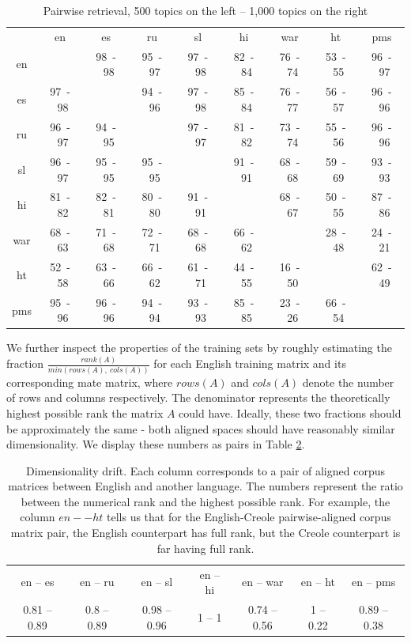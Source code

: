 \documentclass[twoside,11pt]{article}
\begin{document}
{
\renewcommand\tabcolsep{3pt}
\begin{table}[h!]
\caption{Pairwise retrieval, 500 topics on the left -- 1,000 topics on the right}\label{table:retrieval}
\begin{center}
\begin{tabular}{|c|c|c|c|c|c|c|c|c|}
\cline{1-9}
&	en&	es&	ru&	sl&	hi&	war&	ht&	pms\\\cline{1-9}
en&	    &	98~-~98&	95~-~97&	97~-~98&	82~-~84&	76~-~74&	53~-~55&	 96~-~97\\
\cline{1-9}
es&	97~-~98&	&	94~-~96&	97~-~98&	85~-~84&	76~-~77&	56~-~57&	96~-~96\\
\cline{1-9}
ru&	96~-~97&	94~-~95&	&	97~-~97&	81~-~82&	73~-~74&	55~-~56&	96~-~96\\
\cline{1-9}
sl&	96~-~97&	95~-~95&	95~-~95&	&	91~-~91&	68~-~68&	59~-~69&	93~-~93\\
\cline{1-9}
hi&	81~-~82&	82~-~81&	80~-~80&	91~-~91&	&	68~-~67&	50~-~55&	87~-~86\\
\cline{1-9}
war&	68~-~63&	71~-~68&	72~-~71&	68~-~68&	66~-~62&	&	28~-~48&	 24~-~21\\
\cline{1-9}
ht&	52~-~58&	63~-~66&	66~-~62&	61~-~71&	44~-~55&	16~-~50&	&	62~-~49\\
\cline{1-9}
pms&	95~-~96&	96~-~96&	94~-~94&	93~-~93&	85~-~85&	23~-~26&	66~-~54&	 \\
\cline{1-9}
\end{tabular}
\end{center}
\end{table}
}

We further inspect the properties of the training sets by roughly estimating the fraction $\frac{rank(A)}{min\left(rows\left(A\right),~cols\left(A\right)\right)}$ for each English training matrix and its corresponding mate matrix, where $rows(A)$ and $cols(A)$ denote the number of rows and columns respectively. The denominator represents the theoretically highest possible rank the matrix $A$ could have. Ideally, these two fractions should be approximately the same - both aligned spaces should have reasonably similar dimensionality. We display these numbers as pairs in Table \ref{table:rank}.

\begin{table}[h]
\caption{Dimensionality drift. Each column corresponds to a pair of aligned corpus matrices between English and another language. The numbers represent the ratio between the numerical rank and the highest possible rank. For example, the column $en -- ht$ tells us that for the English-Creole pairwise-aligned corpus matrix pair, the English counterpart has full rank, but the Creole counterpart is far having full rank.}
\label{table:rank}
\begin{tabular}{|c|c|c|c|c|c|c|}
\cline{1-7}
en -- es     &   en -- ru     &   en -- sl       &     en -- hi &   en -- war      &      en -- ht &   en -- pms\\
\cline{1-7}
0.81 -- 0.89   &  0.8 -- 0.89  &   0.98 -- 0.96    &    1 -- 1  &  0.74 -- 0.56  &      1 -- 0.22  &   0.89 -- 0.38\\
\cline{1-7}
\end{tabular}
\end{table}
\end{document}
